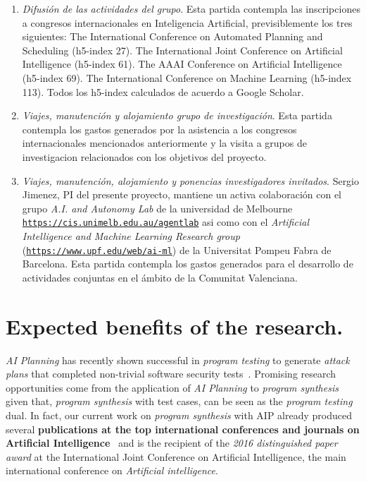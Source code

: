 \documentclass[10pt,a4paper]{paper}
\begin{document}
\begin{enumerate}
\item {\em Difusión de las actividades del grupo}. Esta partida contempla las inscripciones a congresos internacionales en Inteligencia Artificial, previsiblemente los tres siguientes: The International Conference on Automated Planning and Scheduling (h5-index 27). The International Joint Conference on Artificial Intelligence (h5-index 61). The AAAI Conference on Artificial Intelligence (h5-index 69). The International Conference on Machine Learning (h5-index 113). Todos los h5-index calculados de acuerdo a Google Scholar.
\item {\em Viajes, manutención y alojamiento grupo de investigación}. Esta partida contempla los gastos generados por la asistencia a los congresos internacionales mencionados anteriormente y la visita a grupos de investigacion relacionados con los objetivos del proyecto.
\item {\em Viajes, manutención, alojamiento y ponencias investigadores invitados}. Sergio Jimenez, PI del presente proyecto, mantiene un activa colaboración con el grupo {\em A.I. and Autonomy Lab} de la universidad de Melbourne {\tt\small\url{https://cis.unimelb.edu.au/agentlab}} asi como con el {\em Artificial Intelligence and Machine Learning Research group} ({\tt\small\url{https://www.upf.edu/web/ai-ml}}) de la Universitat Pompeu Fabra de Barcelona.  Esta partida contempla los gastos generados para el desarrollo de actividades conjuntas en el ámbito de la Comunitat Valenciana. 
\end{enumerate}



\section{Expected benefits of the research.}
\label{subsec:beneficios}
{\em AI Planning} has recently shown successful in {\em program testing} to generate {\em attack plans} that completed non-trivial software security tests~\cite{hoffmann2015simulated,steinmetz2016revisiting,shmaryahu2016constructing,steinmetz2016goal}. Promising research opportunities come from the application of {\em AI Planning} to {\em program synthesis} given that, {\em program synthesis} with test cases, can be seen as the {\em program testing} dual. In fact, our current work on {\em program synthesis} with AIP already produced several {\bf publications at the top international conferences and journals on Artificial Intelligence}~\cite{segovia2017generating,sergio:aprogramingb:ijcai16,sergio:aprograming:ijcai16,sergio:aprograming:icaps16,segovia:FSC:JAIR2018,segovia:programs:AIJ19} and is the recipient of the {\it 2016 distinguished paper award} at the International Joint Conference on Artificial Intelligence, the main international conference on {\em Artificial intelligence}. 
\end{document}
